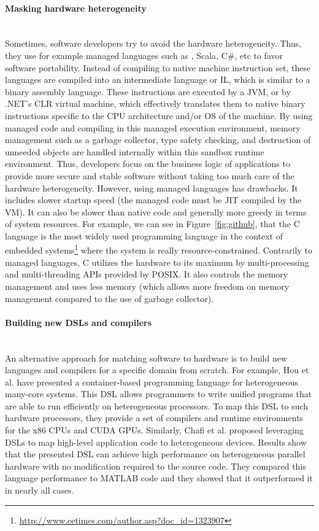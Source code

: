\paragraph{Masking hardware heterogeneity}~\\ 
Sometimes, software developers try to avoid the hardware heterogeneity. Thus, they use for example managed languages such as , Scala, C\#, etc to favor software portability. Instead of compiling to native machine instruction set, these languages are compiled into an intermediate language or IL, which is similar to a binary assembly language. These instructions are executed by a JVM, or by .NET's CLR virtual machine, which effectively translates them to native binary instructions specific to the CPU architecture and/or OS of the machine.
By using managed code and compiling in this managed execution environment, memory management such as a garbage collector, type safety checking, and destruction of unneeded objects are handled internally within this sandbox runtime environment. Thus, developers focus on the business logic of applications to provide more secure and stable software without taking too much care of the hardware heterogeneity.
However, using managed languages has drawbacks. It includes slower startup speed (the managed code must be JIT compiled by the VM). It can also be slower than native code and generally more greedy in terms of system resources. 
For example, we can see in Figure~\ref{fig:github}, that the C language is the most widely used programming language in the context of embedded systems\footnote{\url{http://www.eetimes.com/author.asp?doc_id=1323907}} where the system is really resource-constrained. Contrarily to managed languages, C utilizes the hardware to its maximum by multi-processing and multi-threading APIs provided by POSIX. It also controls the memory management and uses less memory (which allows more freedom on memory management compared to the use of garbage collector).   


\paragraph{Building new DSLs and compilers}~\\ 
An alternative approach for matching software to hardware is to build new languages and compilers for a specific domain from scratch. 
For example, Hou et al.\cite{hou2010spap} have presented a container-based programming language for heterogeneous many-core systems. This DSL allows programmers to write unified programs that are able to run efficiently on heterogeneous processors. To map this DSL to such hardware processors, they provide a set of compilers and runtime environments for the x86 CPUs
and CUDA GPUs. Similarly, Chafi et al.\cite{chafi2010language,chafi2011domain} proposed leveraging DSLs to map high-level application code to heterogeneous devices. Results show that the presented DSL can achieve high performance on heterogeneous parallel hardware with no modification required to the source code. They compared this language performance to MATLAB code and they showed that it outperformed it in nearly all cases.

